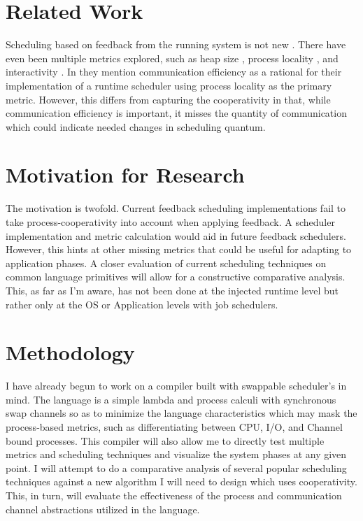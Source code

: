 \documentclass[11pt]{artikel3}
\begin{document}
\section{Related Work}

Scheduling based on feedback from the running system is not new \cite{dietz1997use}. There have even been multiple
metrics explored, such as heap size \cite{white2012automated}, process locality \cite{debattista2002cache}, and interactivity \cite{reppy1993concurrent}.
In \cite{ritson2012multicore} they mention communication efficiency as a rational for their implementation of a runtime scheduler using process locality
as the primary metric. However, this differs from capturing the cooperativity in that, while communication efficiency is important, it misses the quantity
of communication which could indicate needed changes in scheduling quantum.

\section{Motivation for Research}

The motivation is twofold. Current feedback scheduling implementations fail to take process-cooperativity
into account when applying feedback. A scheduler implementation and metric calculation would aid in future
feedback schedulers. However, this hints at other missing metrics that could be useful for adapting to
application phases. A closer evaluation of current scheduling techniques on common language primitives
will allow for a constructive comparative analysis. This, as far as I'm aware, has not been done at the injected
runtime level but rather only at the OS or Application levels with job schedulers.

\section{Methodology}

I have already begun to work on a compiler built with swappable scheduler's in mind. The language
is a simple lambda and process calculi with synchronous swap channels so as to minimize the language
characteristics which may mask the process-based metrics, such as differentiating between CPU, I/O,
and Channel bound processes. This compiler will also allow me to directly test multiple metrics and
scheduling techniques and visualize the system phases at any given point. I will attempt to do a
comparative analysis of several popular scheduling techniques against a new algorithm I will need to design
which uses cooperativity. This, in turn, will evaluate the effectiveness of the process and communication
channel abstractions utilized in the language.
\end{document}
